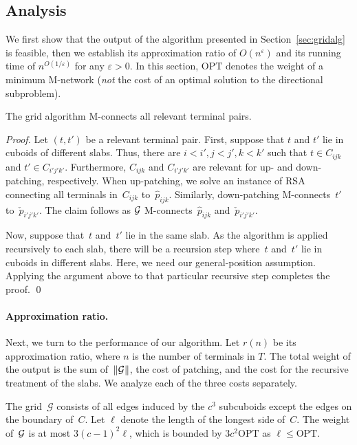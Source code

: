 \documentclass[11pt]{llncs}
\newcommand{\eps}{\ensuremath{\varepsilon}\xspace}
\newcommand{\opt}{\ensuremath{\mathrm{OPT}}\xspace}
\newenvironment{pf}{\begin{proof}}{\qed\end{proof}}
\begin{document}
\subsection{Analysis}

We first show that the output of the algorithm presented in
Section~\ref{sec:gridalg} is feasible, then we 
establish its approximation ratio of $O(n^\eps)$ and its running time
of $n^{O(1/\eps)}$ for any $\eps > 0$. 
In this section,
\opt denotes the weight of a minimum M-network (\emph{not} the cost of
an optimal solution to the directional subproblem).

\begin{lemma}[Feasibility]
  \label{lem:mpaths}
  The grid algorithm M-connects all relevant terminal pairs.
\end{lemma}

\begin{pf} 
  Let $(t,t')$ be a relevant terminal pair.  
  First, suppose that $t$ and $t'$ lie in cuboids of different slabs.
  Thus, there are $i<i',j<j',k<k'$ such that $t\in C_{ijk}$ and $t'\in
  C_{i'j'k'}$.  Furthermore, $C_{ijk}$ and $C_{i'j'k'}$ are
  relevant for up- and down-patching, respectively.
  When up-patching, we solve an instance of RSA
  connecting all terminals in~$C_{ijk}$ to~$\hat{p}_{ijk}$.  Similarly,
  down-patching M-connects~$t'$ to~$\check{p}_{i'j'k'}$.
The claim follows as $\cal G$ M-connects~$\hat{p}_{ijk}$
  and~$\check{p}_{i'j'k'}$.

  Now, suppose that~$t$ and~$t'$ lie in the same slab.  As the
  algorithm is applied recursively to each slab, there will be a recursion
  step where~$t$ and~$t'$ lie in cuboids in different slabs.  Here, we
  need our general-position assumption.  Applying the argument above
  to that particular recursive step completes the proof.
\end{pf}

\paragraph{Approximation ratio.}

Next, we turn to the performance of our algorithm.  Let $r(n)$ be its
approximation ratio, where $n$ is the number of terminals in $T$.  The
total weight of the output is the sum of~$\|{\cal G}\|$, the cost of
patching, and the cost for the recursive treatment of the slabs.  We
analyze each of the three costs separately.

The grid~$\mathcal G$ consists of all edges induced by the $c^3$
subcuboids except the edges on the boundary of~$C$.  Let $\ell$ denote
the length of the longest side of~$C$.  The weight of~$\cal G$ is at
most $3(c-1)^2 \ell$, which is bounded by $3c^2\opt$ as $\ell \le \opt$.
\end{document}
